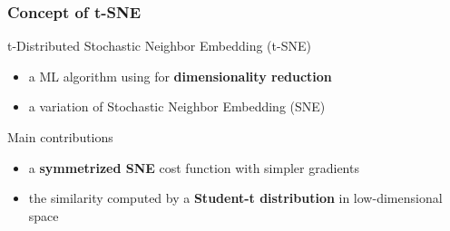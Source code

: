 \documentclass{beamer}
\begin{document}
% 
% 
% 
% 
\begin{frame}
  \frametitle{Concept of t-SNE}

t-Distributed Stochastic Neighbor Embedding (t-SNE)

  \begin{itemize}
    \item a ML algorithm using for \textbf{dimensionality reduction}
    \item a variation of Stochastic Neighbor Embedding (SNE)
  \end{itemize}

Main contributions

   \begin{itemize}
    \item a \textbf{symmetrized SNE} cost function with simpler gradients
    \item the similarity computed by a \textbf{Student-t distribution} in low-dimensional space
  \end{itemize}

\end{frame}
\end{document}
